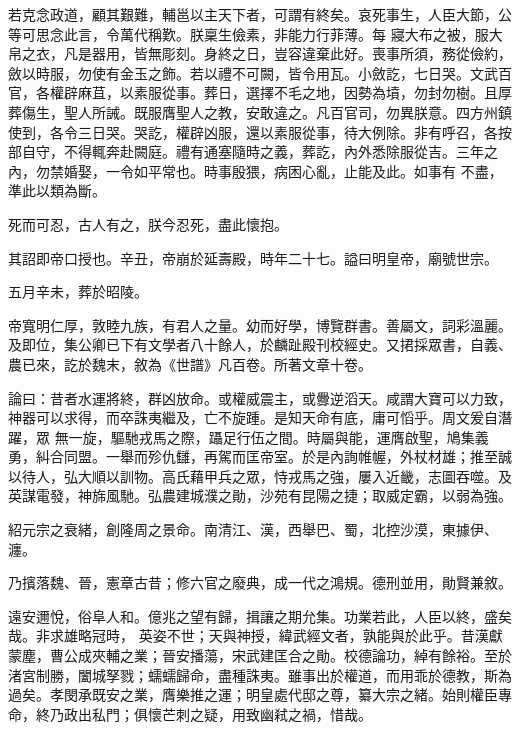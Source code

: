 \begin{pinyinscope}
 若克念政道，顧其艱難，輔邕以主天下者，可謂有終矣。哀死事生，人臣大節，公等可思念此言，令萬代稱歎。朕稟生儉素，非能力行菲薄。每
 寢大布之被，服大帛之衣，凡是器用，皆無彫刻。身終之日，豈容違棄此好。喪事所須，務從儉約，斂以時服，勿使有金玉之飾。若以禮不可闕，皆令用瓦。小斂訖，七日哭。文武百官，各權辟麻苴，以素服從事。葬日，選擇不毛之地，因勢為墳，勿封勿樹。且厚葬傷生，聖人所誡。既服膺聖人之教，安敢違之。凡百官司，勿異朕意。四方州鎮使到，各令三日哭。哭訖，權辟凶服，還以素服從事，待大例除。非有呼召，各按部自守，不得輒奔赴闕庭。禮有通塞隨時之義，葬訖，內外悉除服從吉。三年之內，勿禁婚娶，一令如平常也。時事殷猥，病困心亂，止能及此。如事有
 不盡，準此以類為斷。



 死而可忍，古人有之，朕今忍死，盡此懷抱。



 其詔即帝口授也。辛丑，帝崩於延壽殿，時年二十七。謚曰明皇帝，廟號世宗。



 五月辛未，葬於昭陵。



 帝寬明仁厚，敦睦九族，有君人之量。幼而好學，博覽群書。善屬文，詞彩溫麗。及即位，集公卿已下有文學者八十餘人，於麟趾殿刊校經史。又捃採眾書，自義、農已來，訖於魏末，敘為《世譜》凡百卷。所著文章十卷。



 論曰：昔者水運將終，群凶放命。或權威震主，或釁逆滔天。咸謂大寶可以力致，神器可以求得，而卒誅夷繼及，亡不旋踵。是知天命有底，庸可慆乎。周文爰自潛躍，眾
 無一旋，驅馳戎馬之際，躡足行伍之間。時屬與能，運膺啟聖，鳩集義勇，糾合同盟。一舉而殄仇讎，再駕而匡帝室。於是內詢帷幄，外杖材雄；推至誠以待人，弘大順以訓物。高氏藉甲兵之眾，恃戎馬之強，屢入近畿，志圖吞噬。及英謀電發，神旆風馳。弘農建城濮之勛，沙苑有昆陽之捷；取威定霸，以弱為強。



 紹元宗之衰緒，創隆周之景命。南清江、漢，西舉巴、蜀，北控沙漠，東據伊、瀍。



 乃擯落魏、晉，憲章古昔；修六官之廢典，成一代之鴻規。德刑並用，勛賢兼敘。



 遠安邇悅，俗阜人和。億兆之望有歸，揖讓之期允集。功業若此，人臣以終，盛矣哉。非求雄略冠時，
 英姿不世；天與神授，緯武經文者，孰能與於此乎。昔漢獻蒙塵，曹公成夾輔之業；晉安播蕩，宋武建匡合之勛。校德論功，綽有餘裕。至於渚宮制勝，闔城孥戮；蠕蠕歸命，盡種誅夷。雖事出於權道，而用乖於德教，斯為過矣。孝閔承既安之業，膺樂推之運；明皇處代邸之尊，纂大宗之緒。始則權臣專命，終乃政出私門；俱懷芒刺之疑，用致幽弒之禍，惜哉。



\end{pinyinscope}